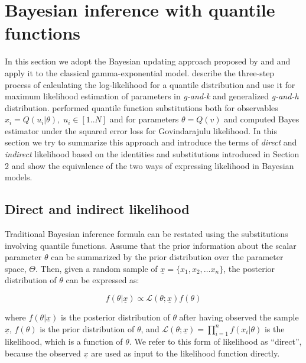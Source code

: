 \documentclass[ba]{imsart}
\numberwithin{equation}{section}
\theoremstyle{plain}
\begin{document}
\hypertarget{bayesian-inference-with-quantile-functions}{%
\section{Bayesian inference with quantile functions}\label{bayesian-inference-with-quantile-functions}}

In this section we adopt the Bayesian updating approach proposed by \citet{rayner2002NumericalMaximumLikelihood} and \citet{nair2020BayesianInferenceQuantile} and apply it to the classical gamma-exponential model. \citet{rayner2002NumericalMaximumLikelihood} describe the three-step process of calculating the log-likelihood for a quantile distribution and use it for maximum likelihood estimation of parameters in \emph{g-and-k} and generalized \emph{g-and-h} distribution. \citet{nair2020BayesianInferenceQuantile} performed quantile function substitutions both for observables \(x_i=Q(u_i|\theta), \; u_i \in [1..N]\) and for parameters \(\theta=Q(v)\) and computed Bayes estimator under the squared error loss for Govindarajulu likelihood. In this section we try to summarize this approach and introduce the terms of \emph{direct} and \emph{indirect} likelihood based on the identities and substitutions introduced in Section 2 and show the equivalence of the two ways of expressing likelihood in Bayesian models.

\hypertarget{direct-and-indirect-likelihood}{%
\subsection{Direct and indirect likelihood}\label{direct-and-indirect-likelihood}}

Traditional Bayesian inference formula can be restated using the substitutions involving quantile functions. Assume that the prior information about the scalar parameter \(\theta\) can be summarized by the prior distribution over the parameter space, \(\Theta\). Then, given a random sample of \(\underline x=\{x_1, x_2, \dots x_n\}\), the posterior distribution of \(\theta\) can be expressed as:

\[
f(\theta|\underline{x}) \propto \mathcal{L}(\theta;\underline{x})f(\theta)
\label{eq:bayespdfeq}
\]

where \(f(\theta|\underline{x})\) is the posterior distribution of \(\theta\) after having observed the sample \(\underline{x}\), \(f(\theta)\) is the prior distribution of \(\theta\), and \(\mathcal{L}(\theta;\underline x)=\prod_{i=1}^{n}f(x_i|\theta)\) is the likelihood, which is a function of \(\theta\). We refer to this form of likelihood as ``direct'', because the observed \(\underline x\) are used as input to the likelihood function directly.
\end{document}
